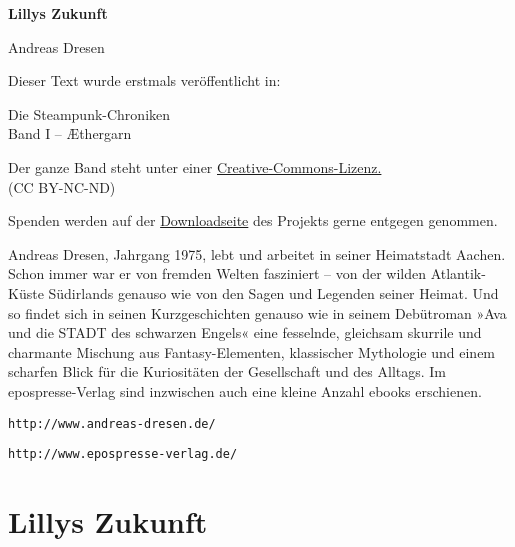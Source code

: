 \usepackage[ngerman]{babel}
\usepackage[T1]{fontenc}



\renewcommand*{\tb}{\begin{center}* \quad * \quad *\end{center}}

\newcommand\bigpar\medskip
\newcommand\gedanke\textit


\raggedbottom
\begin{center}
\textbf{\huge\textsf{Lillys Zukunft}}

\medskip
Andreas Dresen
\end{center}

\bigskip

\begin{flushleft}
Dieser Text wurde erstmals veröffentlicht in:
\begin{center}
Die Steampunk-Chroniken\\
Band I -- Æthergarn
\end{center}

\bigskip

Der ganze Band steht unter einer
\href{http://creativecommons.org/licenses/by-nc-nd/2.0/de/}{Creative-Commons-Lizenz.} \\
(CC BY-NC-ND)

\bigskip

Spenden werden auf der
\href{http://steampunk-chroniken.de/download}{Downloadseite}
des Projekts gerne entgegen genommen.

\vfill

Andreas Dresen, Jahrgang 1975, lebt und arbeitet in seiner
Heimatstadt Aachen. Schon immer war er von fremden Welten
fasziniert – von der wilden Atlantik-Küste Südirlands genauso wie
von den Sagen und Legenden seiner Heimat. Und so findet sich in
seinen Kurzgeschichten genauso wie in seinem Debütroman »Ava und
die STADT des schwarzen Engels« eine fesselnde, gleichsam skurrile
und charmante Mischung aus Fantasy-Elementen, klassischer
Mythologie und einem scharfen Blick für die Kuriositäten der
Gesellschaft und des Alltags. Im epospresse-Verlag sind inzwischen
auch eine kleine Anzahl ebooks erschienen.

\bigpar

\texttt{http://www.andreas-dresen.de/}

\texttt{http://www.epospresse-verlag.de/}
\end{flushleft}

\section{Lillys Zukunft}

